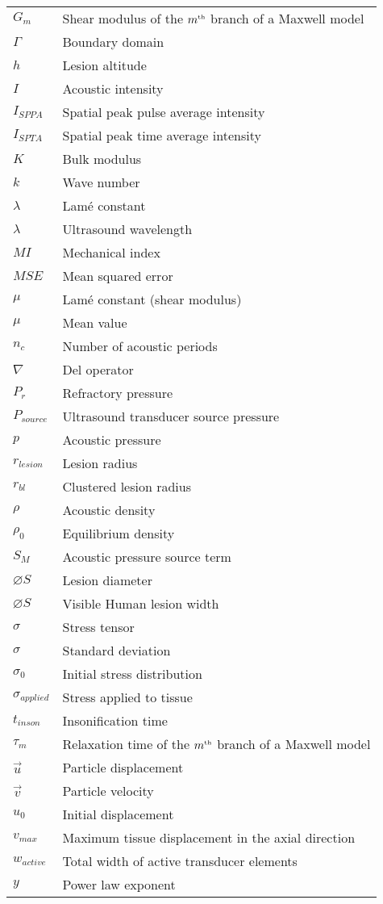 \begin{longtable}[l]{ll}
			$G_m$ & Shear modulus of the $m^{\text{\tiny th}}$ branch of a Maxwell model \\
			$\Gamma$ & Boundary domain \\
			$h$ & Lesion altitude \\
			$I$ & Acoustic intensity \\
			$I_{SPPA}$ & Spatial peak pulse average intensity \\
			$I_{SPTA}$ & Spatial peak time average intensity \\
			$K$ & Bulk modulus \\
			$k$ & Wave number \\
			$\lambda$ & Lam\'{e} constant \\
			$\lambda$ & Ultrasound wavelength \\
			$MI$ & Mechanical index \\
			$MSE$ & Mean squared error \\
			$\mu$ & Lam\'{e} constant (shear modulus) \\
			$\mu$ & Mean value \\
			$n_c$ & Number of acoustic periods \\
			$\nabla$ & Del operator \\
			$P_r$ & Refractory pressure \\
			$P_{source}$ & Ultrasound transducer source pressure \\
			$p$ & Acoustic pressure \\
			$r_{lesion}$ & Lesion radius \\
			$r_{bl}$ & Clustered lesion radius \\
			$\rho$ & Acoustic density \\
			$\rho_0$ & Equilibrium density \\
			$S_M$ & Acoustic pressure source term \\
			$\diameter S$ & Lesion diameter \\
			$\diameter S$ & Visible Human lesion width \\
			$\sigma$ & Stress tensor \\
			$\sigma$ & Standard deviation \\
			$\sigma_0$ & Initial stress distribution \\
			$\sigma_{applied}$ & Stress applied to tissue \\
			$t_{inson}$ & Insonification time \\
			$\tau_m$ & Relaxation time of the $m^{\text{\tiny th}}$ branch of a Maxwell model \\
			$\vec{u}$ & Particle displacement \\
			$\vec{v}$ & Particle velocity \\
			$u_0$ & Initial displacement \\
			$v_{max}$ & Maximum tissue displacement in the axial direction \\
			$w_{active}$ & Total width of active transducer elements \\
			$y$ & Power law exponent \\
		\end{longtable}

